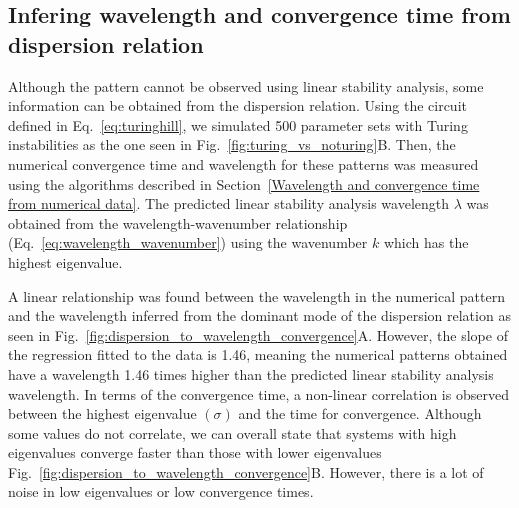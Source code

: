 \subsection{Infering wavelength and convergence time from dispersion relation}
Although the pattern cannot be observed using linear stability analysis, some information can be obtained from the dispersion relation.
Using the circuit defined in Eq.~\ref{eq:turinghill}, we simulated 500 parameter sets with Turing instabilities as the one seen in Fig.~\ref{fig:turing_vs_noturing}B. Then, the numerical convergence time and wavelength for these patterns was measured using the algorithms described in Section~\ref{Wavelength and convergence time from numerical data}.
The predicted linear stability analysis wavelength $\lambda$ was obtained from the wavelength-wavenumber relationship (Eq.~\ref{eq:wavelength_wavenumber}) using the wavenumber $k$ which has the highest eigenvalue.

A linear relationship was found between the wavelength in the numerical pattern and the wavelength inferred from the dominant mode of the dispersion relation as seen in Fig.~\ref{fig:dispersion_to_wavelength_convergence}A. However, the slope of the regression fitted to the data is 1.46, meaning the numerical patterns obtained have a wavelength 1.46 times higher than the predicted linear stability analysis wavelength.
In terms of the convergence time, a non-linear correlation is observed between the highest eigenvalue $(\sigma)$ and the time for convergence.
Although some values do not correlate, we can overall state that systems with high eigenvalues converge faster than those with lower eigenvalues Fig.~\ref{fig:dispersion_to_wavelength_convergence}B.
However, there is a lot of noise in low eigenvalues or low convergence times.

